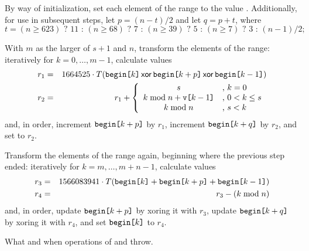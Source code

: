 \begin{itemdescr}
\begin{enumeratea}
 \item
   By way of initialization,
   set each element of the range to the value .
   Additionally,
   for use in subsequent steps,
   let $p = (n - t) / 2$
   and let $q = p + t$,
   where
   \[%
     t = (n \ge 623) \mbox{ ? } 11 \mbox{ : } (n \ge 68) \mbox{ ? } 7 \mbox{ : } (n \ge 39) \mbox{ ? } 5 \mbox{ : } (n \ge 7) \mbox{ ? } 3 \mbox{ : } (n - 1)/2;
   \]%
 \item
   With $m$ as the larger of $s + 1$ and $n$,
   transform the elements of the range:
   iteratively for $ k = 0, \ldots, m-1 $,
   calculate values
   \begin{eqnarray*}
     r_1 & = &
       1664525 \cdot T(    \texttt{begin[}k\texttt{]}
                      \, \mathsf{xor} \, \texttt{begin[}k+p\texttt{]}
                      \, \mathsf{xor} \, \texttt{begin[}k-1 \texttt{]}
                      )
     \\
     r_2 & = & r_1 + \left\{
       \begin{array}{cl}
         s                                  & \mbox{,  } k = 0
         \\
         k \bmod n + \texttt{v[}k-1\texttt{]} & \mbox{,  } 0 < k \le s
         \\
         k \bmod n                          & \mbox{,  } s < k
       \end{array}
     \right.
   \end{eqnarray*}
   and, in order,
   increment $\texttt{begin[}k+p\texttt{]}$ by $r_1$,
   increment $\texttt{begin[}k+q\texttt{]}$ by $r_2$,
   and
   set  to $r_2$.
 \item
   Transform the elements of the range again,
   beginning where the previous step ended:
   iteratively for $ k = m, \ldots, m\!+\!n\!-\!1 $,
   calculate values
   \begin{eqnarray*}
     r_3 & = &
       1566083941 \cdot T( \texttt{begin[}k  \texttt{]}
                         + \texttt{begin[}k+p\texttt{]}
                         + \texttt{begin[}k-1\texttt{]}
                         )
     \\
     r_4 & = & r_3 - (k \bmod n)
   \end{eqnarray*}
   and, in order,
   \noindent
   update $\texttt{begin[}k+p\texttt{]}$ by xoring it with $r_3$,
   update $\texttt{begin[}k+q\texttt{]}$ by xoring it with $r_4$,
   and
   set $\texttt{begin[}k\texttt{]}$ to $r_4$.
\end{enumeratea}

\pnum\throws
What and when  operations of 
and  throw.
\end{itemdescr}

